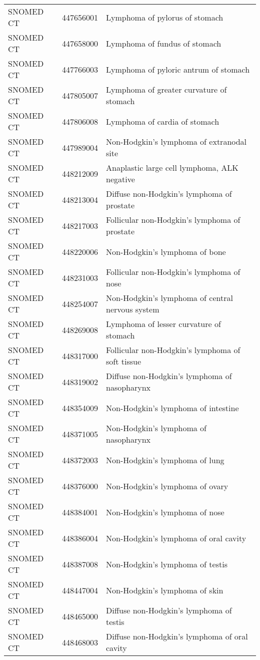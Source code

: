 \begin{table}[ht]
\begin{tabular}{lll}
  SNOMED CT & 447656001 & Lymphoma of pylorus of stomach \\ 
  SNOMED CT & 447658000 & Lymphoma of fundus of stomach \\ 
  SNOMED CT & 447766003 & Lymphoma of pyloric antrum of stomach \\ 
  SNOMED CT & 447805007 & Lymphoma of greater curvature of stomach \\ 
  SNOMED CT & 447806008 & Lymphoma of cardia of stomach \\ 
  SNOMED CT & 447989004 & Non-Hodgkin's lymphoma of extranodal site \\ 
  SNOMED CT & 448212009 & Anaplastic large cell lymphoma, ALK negative \\ 
  SNOMED CT & 448213004 & Diffuse non-Hodgkin's lymphoma of prostate \\ 
  SNOMED CT & 448217003 & Follicular non-Hodgkin's lymphoma of prostate \\ 
  SNOMED CT & 448220006 & Non-Hodgkin's lymphoma of bone \\ 
  SNOMED CT & 448231003 & Follicular non-Hodgkin's lymphoma of nose \\ 
  SNOMED CT & 448254007 & Non-Hodgkin's lymphoma of central nervous system \\ 
  SNOMED CT & 448269008 & Lymphoma of lesser curvature of stomach \\ 
  SNOMED CT & 448317000 & Follicular non-Hodgkin's lymphoma of soft tissue \\ 
  SNOMED CT & 448319002 & Diffuse non-Hodgkin's lymphoma of nasopharynx \\ 
  SNOMED CT & 448354009 & Non-Hodgkin's lymphoma of intestine \\ 
  SNOMED CT & 448371005 & Non-Hodgkin's lymphoma of nasopharynx \\ 
  SNOMED CT & 448372003 & Non-Hodgkin's lymphoma of lung \\ 
  SNOMED CT & 448376000 & Non-Hodgkin's lymphoma of ovary \\ 
  SNOMED CT & 448384001 & Non-Hodgkin's lymphoma of nose \\ 
  SNOMED CT & 448386004 & Non-Hodgkin's lymphoma of oral cavity \\ 
  SNOMED CT & 448387008 & Non-Hodgkin's lymphoma of testis \\ 
  SNOMED CT & 448447004 & Non-Hodgkin's lymphoma of skin \\ 
  SNOMED CT & 448465000 & Diffuse non-Hodgkin's lymphoma of testis \\ 
  SNOMED CT & 448468003 & Diffuse non-Hodgkin's lymphoma of oral cavity \\ 

\end{tabular}
\end{table}
